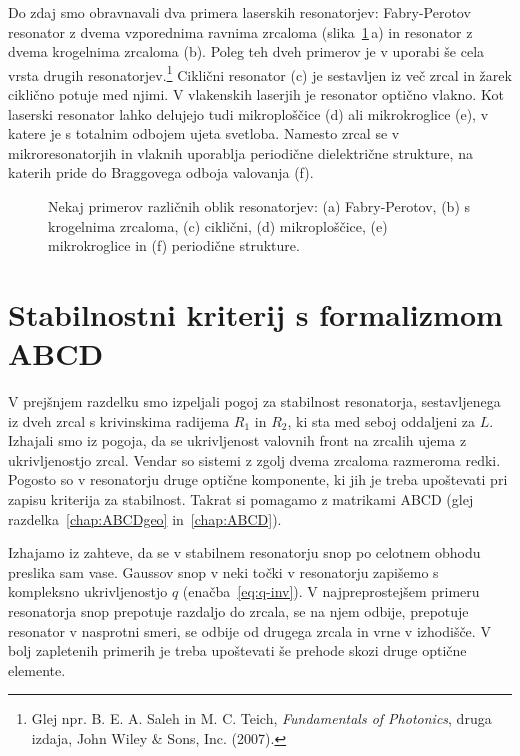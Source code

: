Do zdaj smo obravnavali dva primera laserskih resonatorjev: Fabry-Perotov
resonator z dvema vzporednima ravnima zrcaloma (slika~\ref{fig:resonatorji}\,a) 
in resonator z dvema krogelnima zrcaloma (b).
Poleg teh dveh primerov je v uporabi še cela vrsta drugih resonatorjev.\footnote{Glej 
npr. B. E. A. Saleh in M. C. Teich, 
{\it Fundamentals of Photonics}, druga izdaja, John Wiley \& Sons, Inc. (2007).} Ciklični
resonator (c) je
sestavljen iz več zrcal in žarek ciklično potuje med njimi. V vlakenskih laserjih je resonator
optično vlakno. 
Kot laserski resonator lahko delujejo tudi mikroploščice (d) ali mikrokroglice (e), 
v katere je s totalnim odbojem ujeta svetloba. 
Namesto zrcal se v mikroresonatorjih in vlaknih uporablja periodične dielektrične strukture, na katerih 
pride do Braggovega odboja valovanja (f).
\begin{figure}[ht]
\centering
\def\svgwidth{128truemm} 

\caption{Nekaj primerov različnih oblik resonatorjev: (a) Fabry-Perotov, (b) s krogelnima
zrcaloma, (c) ciklični, (d) mikroploščice, (e) mikrokroglice in (f) periodične strukture.}
\label{fig:resonatorji}
\end{figure}

\section{Stabilnostni kriterij s formalizmom ABCD}
V prejšnjem razdelku smo izpeljali pogoj za stabilnost resonatorja, 
sestavljenega iz dveh zrcal s krivinskima radijema $R_1$ in $R_2$, ki sta med 
seboj oddaljeni za $L$. Izhajali smo iz pogoja, da se ukrivljenost
valovnih front na zrcalih ujema z ukrivljenostjo zrcal. Vendar so sistemi z
zgolj dvema zrcaloma razmeroma redki. Pogosto so v resonatorju
druge optične komponente, ki jih je treba upoštevati pri zapisu
kriterija za stabilnost. Takrat si pomagamo z matrikami ABCD
(glej razdelka~\ref{chap:ABCDgeo} in~\ref{chap:ABCD}). 

Izhajamo iz zahteve, da se v stabilnem resonatorju snop po celotnem obhodu
preslika sam vase. Gaussov snop v neki točki v resonatorju 
zapišemo s kompleksno ukrivljenostjo $q$ (enačba~\ref{eq:q-inv}).
V najpreprostejšem primeru resonatorja snop prepotuje razdaljo do zrcala, se na njem 
odbije, prepotuje resonator v nasprotni smeri, se odbije od drugega zrcala in vrne 
v izhodišče. V bolj zapletenih primerih je treba upoštevati še 
prehode skozi druge optične elemente.

